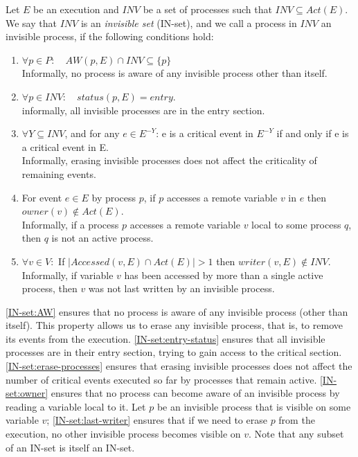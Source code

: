 \begin{definition}
\label{def:inv}
	Let $E$ be an execution and $\mathit{INV}$ be a set of processes such that $\mathit{INV} \subseteq Act(E)$. We say that $\mathit{INV}$ is an \emph{invisible set} (IN-set), and we call a process in $\mathit{INV}$ an invisible process, if the following conditions hold:
	\begin{enumerate}
		\renewcommand{\theenumi}{IN\arabic{enumi}}
		\renewcommand{\labelenumi}{\textbf{\theenumi:}}
		
		\item \label{IN-set:AW} $\forall p \in P: \quad AW(p,E) \cap \mathit{INV} \subseteq \{p\}$
		\\ Informally, no process is aware of any invisible process other than itself.
		\item \label{IN-set:entry-status} $\forall p \in \mathit{INV}: \quad status(p, E) = entry$.
		\\informally, all invisible processes are in the entry section.
		\item \label{IN-set:erase-processes} $\forall Y \subseteq \mathit{INV}$, and for any $e \in E^{-Y}$: e is a critical event in $E^{-Y}$ if and only if e is a critical event in E.
		\\ Informally, erasing invisible processes does not affect the criticality of remaining events.
		\item \label{IN-set:owner} For event $e \in E$ by process $p$, if $p$ accesses a remote variable $v$ in $e$ then $owner(v) \notin Act(E)$.
		\\ Informally, if a process $p$ accesses a remote variable $v$ local to some process $q$, then $q$ is not an active process.
		\item \label{IN-set:last-writer} $\forall v \in V:$ If $|Accessed(v,E) \cap Act(E)| > 1$ then $writer(v,E) \notin \mathit{INV}$.
		\\ Informally, if variable $v$ has been accessed by more than a single active process, then $v$ was not last written by an invisible process.
	\end{enumerate}
\end{definition}
	
\ref{IN-set:AW} ensures that no process is aware of any invisible process (other than itself). This property allows us to erase any invisible process, that is, to remove its events from the execution. \ref{IN-set:entry-status} ensures that all invisible processes are in their entry section, trying to gain access to the critical section. \ref{IN-set:erase-processes} ensures that erasing invisible processes does not affect the number of critical events executed so far by processes that remain active. \ref{IN-set:owner} ensures that no process can become aware of an invisible process by reading a variable local to it.
Let $p$ be an invisible process that is visible on some variable $v$; \ref{IN-set:last-writer} ensures that if we need to erase $p$ from the execution, no other invisible process becomes visible on $v$. Note that any subset of an IN-set is itself an IN-set.

